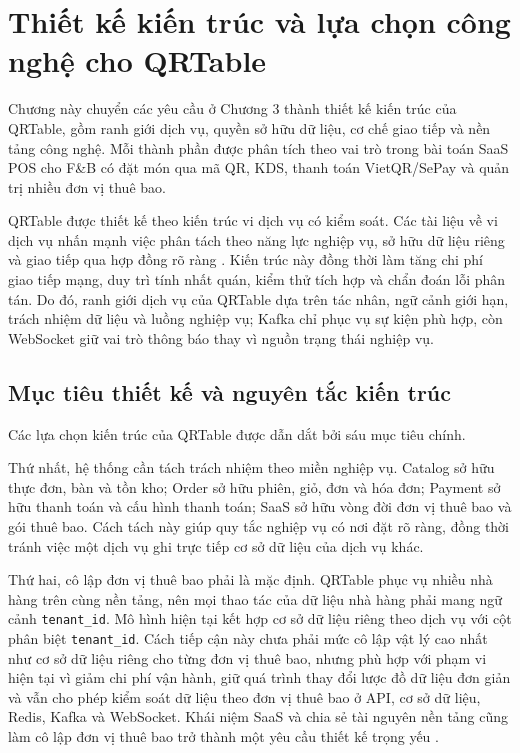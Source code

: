 \chapter{Thiết kế kiến trúc và lựa chọn công nghệ cho QRTable}

Chương này chuyển các yêu cầu ở Chương 3 thành thiết kế kiến trúc của QRTable, gồm ranh giới dịch vụ, quyền sở hữu dữ liệu, cơ chế giao tiếp và nền tảng công nghệ. Mỗi thành phần được phân tích theo vai trò trong bài toán SaaS POS cho F\&B có đặt món qua mã QR, KDS, thanh toán VietQR/SePay và quản trị nhiều đơn vị thuê bao.

QRTable được thiết kế theo kiến trúc vi dịch vụ có kiểm soát. Các tài liệu về vi dịch vụ nhấn mạnh việc phân tách theo năng lực nghiệp vụ, sở hữu dữ liệu riêng và giao tiếp qua hợp đồng rõ ràng \cite{lewis-fowler-microservices-2014}. Kiến trúc này đồng thời làm tăng chi phí giao tiếp mạng, duy trì tính nhất quán, kiểm thử tích hợp và chẩn đoán lỗi phân tán. Do đó, ranh giới dịch vụ của QRTable dựa trên tác nhân, ngữ cảnh giới hạn, trách nhiệm dữ liệu và luồng nghiệp vụ; Kafka chỉ phục vụ sự kiện phù hợp, còn WebSocket giữ vai trò thông báo thay vì nguồn trạng thái nghiệp vụ.

\section{Mục tiêu thiết kế và nguyên tắc kiến trúc}

Các lựa chọn kiến trúc của QRTable được dẫn dắt bởi sáu mục tiêu chính.

Thứ nhất, hệ thống cần tách trách nhiệm theo miền nghiệp vụ. Catalog sở hữu thực đơn, bàn và tồn kho; Order sở hữu phiên, giỏ, đơn và hóa đơn; Payment sở hữu thanh toán và cấu hình thanh toán; SaaS sở hữu vòng đời đơn vị thuê bao và gói thuê bao. Cách tách này giúp quy tắc nghiệp vụ có nơi đặt rõ ràng, đồng thời tránh việc một dịch vụ ghi trực tiếp cơ sở dữ liệu của dịch vụ khác.

Thứ hai, cô lập đơn vị thuê bao phải là mặc định. QRTable phục vụ nhiều nhà hàng trên cùng nền tảng, nên mọi thao tác của dữ liệu nhà hàng phải mang ngữ cảnh \texttt{tenant\_id}. Mô hình hiện tại kết hợp cơ sở dữ liệu riêng theo dịch vụ với cột phân biệt \texttt{tenant\_id}. Cách tiếp cận này chưa phải mức cô lập vật lý cao nhất như cơ sở dữ liệu riêng cho từng đơn vị thuê bao, nhưng phù hợp với phạm vi hiện tại vì giảm chi phí vận hành, giữ quá trình thay đổi lược đồ dữ liệu đơn giản và vẫn cho phép kiểm soát dữ liệu theo đơn vị thuê bao ở API, cơ sở dữ liệu, Redis, Kafka và WebSocket. Khái niệm SaaS và chia sẻ tài nguyên nền tảng cũng làm cô lập đơn vị thuê bao trở thành một yêu cầu thiết kế trọng yếu \cite{nist-sp800145-2011}.

